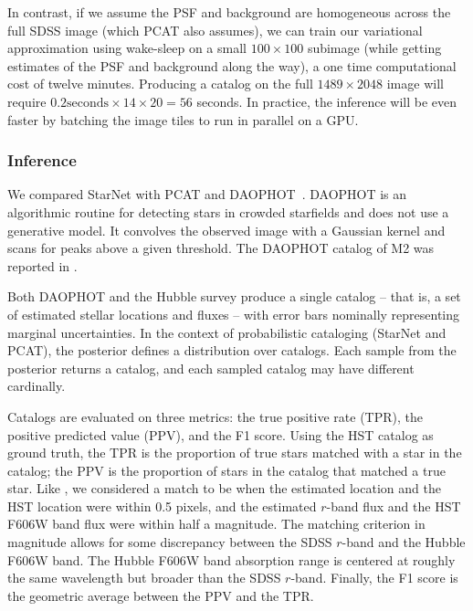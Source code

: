 In contrast, if we assume the PSF and background are homogeneous 
across the full SDSS image (which PCAT also assumes), we can 
train our variational approximation using wake-sleep 
on a small $100 \times 100$ subimage
(while getting estimates of the PSF and background along the way),
a one time computational cost of twelve minutes. 
Producing a catalog on the full $1489 \times 2048$ image will require 
$0.2\text{seconds} \times 14 \times 20 = 56$ seconds. In practice, 
the inference will be even faster by batching the image tiles to run in parallel on a GPU. 



\subsubsection{Inference}
\label{sec:m2_results}
We compared StarNet with PCAT and DAOPHOT~\cite{stetson2987daophot}. 
DAOPHOT is an algorithmic routine for detecting stars in crowded starfields and does not use a generative model. 
It convolves the observed image with a Gaussian kernel and scans for peaks above a given threshold. 
The DAOPHOT catalog of M2 was reported in 
\cite{An_2008_m2}. 

Both DAOPHOT and the Hubble survey produce a single catalog -- that is, a set of estimated stellar locations and fluxes -- with
error bars nominally representing marginal uncertainties.
In the context of probabilistic cataloging (StarNet and PCAT), the posterior 
defines a distribution over catalogs.
Each sample from the posterior returns a catalog, and each 
sampled catalog may have different cardinally. 

Catalogs are evaluated on three metrics: the true positive rate (TPR), the positive predicted value (PPV), and the F1 score. Using the HST catalog as ground truth, the TPR is the proportion of true stars matched with a star in the catalog;
the PPV is the proportion of stars in the catalog that matched a true star. Like \cite{Portillo_2017, Feder_2019}, we considered a match to be when the estimated location and the HST location were within 0.5 pixels,
and the estimated $r$-band flux and the HST F606W band flux were within half a
magnitude. 
The matching criterion in magnitude allows for some discrepancy between the SDSS $r$-band and the Hubble F606W band. 
The Hubble F606W band absorption range is centered at roughly the same wavelength but broader than the SDSS $r$-band. 
Finally, the F1 score is the geometric average between the PPV and the TPR. 

